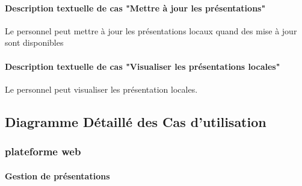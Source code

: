 \documentclass[12pt, ChapStyle1, oneside]{./Styles/Dea_Gsm}
\begin{document}
\paragraph{Description textuelle de cas "Mettre à jour les présentations"}
Le personnel peut mettre à jour les présentations locaux quand des mise à jour sont disponibles
\paragraph{Description textuelle de cas "Visualiser les présentations locales"}
Le personnel peut visualiser les présentation locales.
\subsection{Diagramme Détaillé des Cas d’utilisation}
\subsubsection{plateforme web}
\paragraph{Gestion de présentations}
\end{document}
